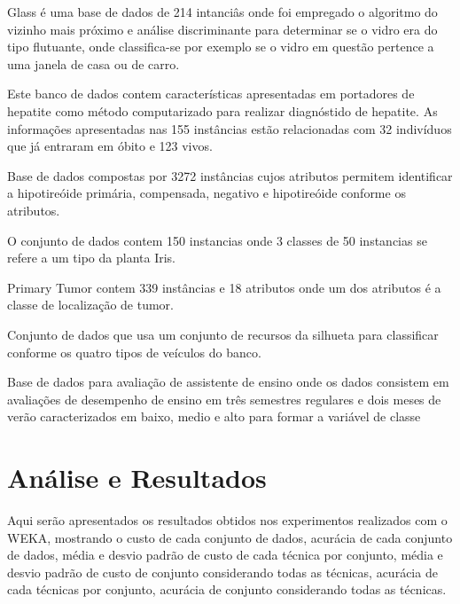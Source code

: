 \documentclass[12pt]{article}
\begin{document}
 \label{sec:glass}

Glass é uma base de dados de 214 intanciâs onde foi empregado o algoritmo do vizinho mais próximo e análise discriminante para determinar se o vidro era do tipo flutuante, onde classifica-se por exemplo se o vidro em questão pertence a uma janela de casa ou de carro.

 \label{sec:hepatitis}

Este banco de dados contem características apresentadas em portadores de hepatite como método computarizado para realizar diagnóstido de hepatite. As informações apresentadas nas 155 instâncias estão relacionadas com 32 indivíduos que já entraram em óbito e 123 vivos.

 \label{sec:hypo}

Base de dados compostas por 3272 instâncias cujos atributos permitem identificar a hipotireóide primária, compensada, negativo e hipotireóide conforme os atributos.

 \label{sec:iris}

O conjunto de dados contem 150 instancias onde 3 classes de 50 instancias se refere a um tipo da planta Iris.

 \label{sec:tumor}

Primary Tumor contem 339 instâncias e 18 atributos onde um dos atributos é a classe de localização de tumor.

 \label{sec:vehicle}

Conjunto de dados que usa um conjunto de recursos da silhueta para classificar conforme os quatro tipos de veículos do banco.

 \label{sec:tae}

Base de dados para avaliação de assistente de ensino onde os dados consistem em avaliações de desempenho de ensino em três semestres regulares e dois meses de verão caracterizados em baixo, medio e alto para formar a variável de classe

\section{Análise e Resultados} \label{sec:analise}

Aqui serão apresentados os resultados obtidos nos experimentos realizados com o WEKA, mostrando o custo de cada conjunto de dados, acurácia de cada conjunto de dados, média e desvio padrão de custo de cada técnica por conjunto, média e desvio padrão de custo de conjunto considerando todas as técnicas, acurácia de cada técnicas por conjunto, acurácia de conjunto considerando todas as técnicas.
\end{document}
